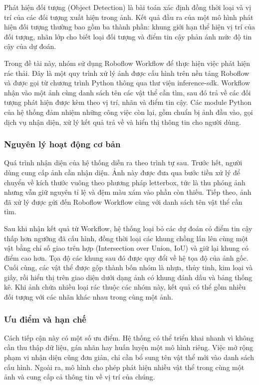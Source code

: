 \documentclass[a4paper,13pt]{extarticle}
\begin{document}
Phát hiện đối tượng (Object Detection) là bài toán xác định đồng thời loại và vị trí của các đối tượng xuất hiện trong ảnh. Kết quả đầu ra của một mô hình phát hiện đối tượng thường bao gồm ba thành phần: khung giới hạn thể hiện vị trí của đối tượng, nhãn lớp cho biết loại đối tượng và điểm tin cậy phản ánh mức độ tin cậy của dự đoán.

Trong đề tài này, nhóm sử dụng Roboflow Workflow để thực hiện việc phát hiện rác thải. Đây là một quy trình xử lý ảnh được cấu hình trên nền tảng Roboflow và được gọi từ chương trình Python thông qua thư viện inference-sdk. Workflow nhận vào một ảnh cùng danh sách tên các vật thể cần tìm, sau đó trả về các đối tượng phát hiện được kèm theo vị trí, nhãn và điểm tin cậy. Các module Python của hệ thống đảm nhiệm những công việc còn lại, gồm chuẩn bị ảnh đầu vào, gọi dịch vụ nhận diện, xử lý kết quả trả về và hiển thị thông tin cho người dùng.

\subsubsection{Nguyên lý hoạt động cơ bản}

Quá trình nhận diện của hệ thống diễn ra theo trình tự sau. Trước hết, người dùng cung cấp ảnh cần nhận diện. Ảnh này được đưa qua bước tiền xử lý để chuyển về kích thước vuông theo phương pháp letterbox, tức là thu phóng ảnh nhưng vẫn giữ nguyên tỉ lệ và đệm màu xám vào phần còn thiếu. Tiếp theo, ảnh đã xử lý được gửi đến Roboflow Workflow cùng với danh sách tên vật thể cần tìm. 

Sau khi nhận kết quả từ Workflow, hệ thống loại bỏ các dự đoán có điểm tin cậy thấp hơn ngưỡng đã cấu hình, đồng thời loại các khung chồng lấn lên cùng một vật bằng chỉ số giao trên hợp (Intersection over Union, IoU) và giữ lại khung có điểm cao hơn. Tọa độ các khung sau đó được quy đổi về hệ tọa độ của ảnh gốc. Cuối cùng, các vật thể được gộp thành bốn nhóm là nhựa, thủy tinh, kim loại và giấy, rồi hiển thị trên giao diện dưới dạng ảnh có khung đánh dấu và bảng thống kê. Khi ảnh chứa nhiều loại rác thuộc các nhóm này, kết quả có thể gồm nhiều đối tượng với các nhãn khác nhau trong cùng một ảnh.
\subsubsection{Ưu điểm và hạn chế}

Cách tiếp cận này có một số ưu điểm. Hệ thống có thể triển khai nhanh vì không cần thu thập dữ liệu, gán nhãn hay huấn luyện một mô hình riêng. Việc mở rộng phạm vi nhận diện cũng đơn giản, chỉ cần bổ sung tên vật thể mới vào danh sách cấu hình. Ngoài ra, mô hình cho phép phát hiện nhiều vật thể trong cùng một ảnh và cung cấp cả thông tin về vị trí của chúng.
\end{document}
